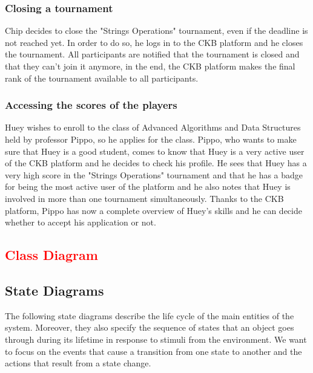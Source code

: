 \subsubsection{Closing a tournament}
Chip decides to close the "Strings Operations" tournament, even if the deadline is not reached yet.
In order to do so, he logs in to the CKB platform and he closes the tournament.
All participants are notified that the tournament is closed and that they can't join it anymore, in the end, the CKB platform makes the final rank of the tournament available to all participants.

\subsubsection{Accessing the scores of the players}
Huey wishes to enroll to the class of Advanced Algorithms and Data Structures held by professor Pippo, so he applies for the class.
Pippo, who wants to make sure that Huey is a good student, comes to know that Huey is a very active user of the CKB platform and he decides to check his profile.
He sees that Huey has a very high score in the "Strings Operations" tournament and that he has a badge for being the most active user of the platform and he also notes that Huey is involved in more than one tournament simultaneously.
Thanks to the CKB platform, Pippo has now a complete overview of Huey's skills and he can decide whether to accept his application or not.

\subsection{\textcolor{red}{Class Diagram}}

\subsection{State Diagrams}
The following state diagrams describe the life cycle of the main entities of the system.
Moreover, they also specify the sequence of states that an object goes through during its lifetime in response to stimuli from the environment.
We want to focus on the events that cause a transition from one state to another and the actions that result from a state change.


